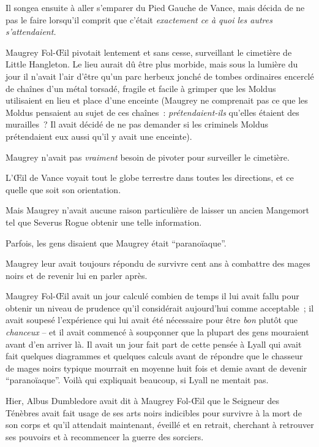 Il songea ensuite à aller s'emparer du Pied Gauche de Vance, mais décida de ne pas le faire lorsqu'il comprit que c'était \emph{exactement ce à quoi les autres s'attendaient.}

Maugrey Fol-Œil pivotait lentement et sans cesse, surveillant le cimetière de Little Hangleton. Le lieu aurait dû être plus morbide, mais sous la lumière du jour il n'avait l'air d'être qu'un parc herbeux jonché de tombes ordinaires encerclé de chaînes d'un métal torsadé, fragile et facile à grimper que les Moldus utilisaient en lieu et place d'une enceinte (Maugrey ne comprenait pas ce que les Moldus pensaient au sujet de ces chaînes~: \emph{prétendaient-ils} qu'elles étaient des murailles~? Il avait décidé de ne pas demander si les criminels Moldus prétendaient eux aussi qu'il y avait une enceinte).

Maugrey n'avait pas \emph{vraiment} besoin de pivoter pour surveiller le cimetière.

L'Œil de Vance voyait tout le globe terrestre dans toutes les directions, et ce quelle que soit son orientation.

Mais Maugrey n'avait aucune raison particulière de laisser un ancien Mangemort tel que Severus Rogue obtenir une telle information.

Parfois, les gens disaient que Maugrey était “paranoïaque”.

Maugrey leur avait toujours répondu de survivre cent ans à combattre des mages noirs et de revenir lui en parler après.

Maugrey Fol-Œil avait un jour calculé combien de temps il lui avait fallu pour obtenir un niveau de prudence qu'il considérait aujourd'hui comme acceptable~; il avait soupesé l'expérience qui lui avait été nécessaire pour être \emph{bon} plutôt que \emph{chanceux} -- et il avait commencé à soupçonner que la plupart des gens mouraient avant d'en arriver là. Il avait un jour fait part de cette pensée à Lyall qui avait fait quelques diagrammes et quelques calculs avant de répondre que le chasseur de mages noirs typique mourrait en moyenne huit fois et demie avant de devenir “paranoïaque”. Voilà qui expliquait beaucoup, si Lyall ne mentait pas.

Hier, Albus Dumbledore avait dit à Maugrey Fol-Œil que le Seigneur des Ténèbres avait fait usage de ses arts noirs indicibles pour survivre à la mort de son corps et qu'il attendait maintenant, éveillé et en retrait, cherchant à retrouver ses pouvoirs et à recommencer la guerre des sorciers.

